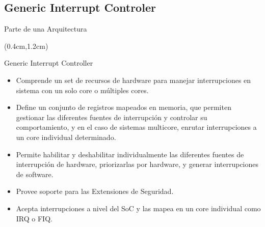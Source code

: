 \documentclass[table,x11names,aspectratio=169]{beamer}
\begin{document}
\subsection{Generic Interrupt Controler}
\begin{frame}[t]{Parte de una Arquitectura}
 \begin{textblock*}{\textwidth}(0.4cm,1.2cm)
  \begin{block}{Generic Interrupt Controller}
   \begin{itemize}[<+(1)->]\justifying
    \item Comprende un set de recursos de hardware para manejar interrupciones en sistema con un solo core o múltiples cores. 
    \item Define un conjunto de registros mapeados en memoria, que permiten gestionar las diferentes fuentes de interrupción y controlar su comportamiento, y en el caso de sistemas multicore, enrutar interrupciones a un core individual determinado.
    \item Permite habilitar y deshabilitar individualmente las diferentes fuentes de interrupción de hardware, priorizarlas por hardware, y generar interrupciones de software. 
    \item Provee soporte para las Extensiones de Seguridad.
    \item Acepta interrupciones a nivel del SoC y las mapea en un core individual como IRQ o FIQ.
   \end{itemize}
  \end{block}
 \end{textblock*}
\end{frame}
\end{document}
